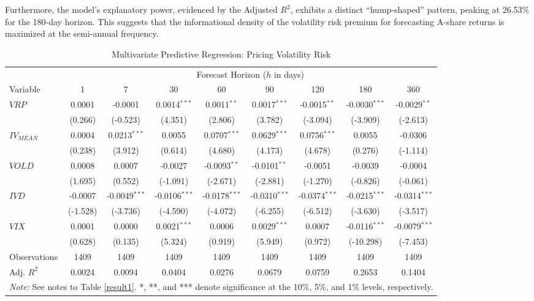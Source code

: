 \documentclass[a4paper, 12pt]{article}    %
\begin{document}
Furthermore, the model’s explanatory power, evidenced by the Adjusted $R^2$, exhibits a distinct ``hump-shaped'' pattern, peaking at 26.53\% for the 180-day horizon. This suggests that the informational density of the volatility risk premium for forecasting A-share returns is maximized at the semi-annual frequency.


\begin{table}[htbp]
\centering
\footnotesize 
\setlength{\tabcolsep}{3.2pt} 
\caption{Multivariate Predictive Regression: Pricing Volatility Risk}
\label{tab:multivariate_baseline}
\renewcommand{\arraystretch}{1.2}
\begin{tabular*}{\textwidth}{@{\extracolsep{\fill}}lcccccccc}
\toprule
 & \multicolumn{8}{c}{Forecast Horizon ($h$ in days)} \\
\cmidrule(lr){2-9}
Variable & 1 & 7 & 30 & 60 & 90 & 120 & 180 & 360 \\
\midrule
\textbf{$VRP$} & 0.0001 & -0.0001 & 0.0014$^{***}$ & 0.0011$^{**}$ & 0.0017$^{***}$ & -0.0015$^{**}$ & -0.0030$^{***}$ & -0.0029$^{**}$ \\
 & (0.266) & (-0.523) & (4.351) & (2.806) & (3.782) & (-3.094) & (-3.909) & (-2.613) \\
\midrule
$IV_{MEAN}$ & 0.0004 & 0.0213$^{***}$ & 0.0055 & 0.0707$^{***}$ & 0.0629$^{***}$ & 0.0756$^{***}$ & 0.0055 & -0.0306 \\
 & (0.238) & (3.912) & (0.614) & (4.680) & (4.173) & (4.678) & (0.276) & (-1.114) \\
\addlinespace
$VOLD$ & 0.0008 & 0.0007 & -0.0027 & -0.0093$^{**}$ & -0.0101$^{**}$ & -0.0051 & -0.0039 & -0.0004 \\
 & (1.695) & (0.552) & (-1.091) & (-2.671) & (-2.881) & (-1.270) & (-0.826) & (-0.061) \\
\addlinespace
$IVD$ & -0.0007 & -0.0049$^{***}$ & -0.0106$^{***}$ & -0.0178$^{***}$ & -0.0310$^{***}$ & -0.0374$^{***}$ & -0.0215$^{***}$ & -0.0314$^{***}$ \\
 & (-1.528) & (-3.736) & (-4.590) & (-4.072) & (-6.255) & (-6.512) & (-3.630) & (-3.517) \\
\addlinespace
$VIX$ & 0.0001 & 0.0000 & 0.0021$^{***}$ & 0.0006 & 0.0029$^{***}$ & 0.0007 & -0.0116$^{***}$ & -0.0079$^{***}$ \\
 & (0.628) & (0.135) & (5.324) & (0.919) & (5.949) & (0.972) & (-10.298) & (-7.453) \\
\midrule
Observations & 1409 & 1409 & 1409 & 1409 & 1409 & 1409 & 1409 & 1409 \\
Adj. $R^2$ & 0.0024 & 0.0094 & 0.0404 & 0.0276 & 0.0679 & 0.0759 & 0.2653 & 0.1404 \\
\bottomrule
\multicolumn{9}{l}{\scriptsize \textit{Note:} See notes to Table \ref{result1}. *, **, and *** denote significance at the 10\%, 5\%, and 1\% levels, respectively.} \\
\end{tabular*}
\end{table}
\end{document}

